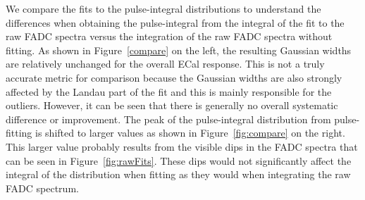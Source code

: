 \documentclass[twoside]{article}
\begin{document}
We compare the fits to the pulse-integral distributions to understand the differences when obtaining the pulse-integral from the integral of the fit to the raw FADC spectra versus the integration of the raw FADC spectra without fitting. As shown in Figure~\ref{compare} on the left, the resulting Gaussian widths are relatively unchanged for the overall ECal response. This is not a truly accurate metric for comparison because the Gaussian widths are also strongly affected by the Landau part of the fit and this is mainly responsible for the outliers. However, it can be seen that there is generally no overall systematic difference or improvement. The peak of the pulse-integral distribution from pulse-fitting is shifted to larger values as shown in Figure~\ref{fig:compare} on the right. This larger value probably results from the visible dips in the FADC spectra that can be seen in Figure~\ref{fig:rawFits}. These dips would not significantly affect the integral of the distribution when fitting as they would when integrating the raw FADC spectrum.
\end{document}
